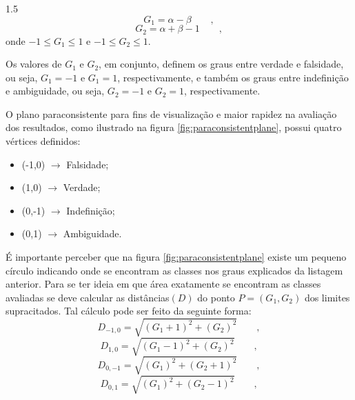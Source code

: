 \documentclass[a4paper,12pt,openright,oneside]{book}
\newenvironment{myenv}[1]
{\begin{spacing}{#1}}
	{\end{spacing}}
\begin{document}
\begin{myenv}{1.5}
\begin{equation}
G_1=\alpha-\beta\qquad,
\end{equation}
\begin{equation}
G_2=\alpha+\beta-1 \qquad,
\end{equation}
onde $-1 \leqslant G_1 \leqslant 1$ e  $-1 \leqslant G_2 \leqslant 1$.
\\
\par Os valores de $G_1$ e $G_2$, em conjunto, definem os graus entre verdade e falsidade, ou seja, $G_1=-1$ e $G_1=1$, respectivamente, e também os graus entre indefinição e ambiguidade, ou seja, $G_2=-1$ e $G_2=1$, respectivamente.
\\
\par O plano paraconsistente para fins de visualização e maior rapidez na avaliação dos resultados, como ilustrado na figura \ref{fig:paraconsistentplane}, possui quatro vértices definidos:
\begin{itemize}
\item (-1,0) $\rightarrow$ Falsidade;
\item (1,0) $\rightarrow$ Verdade;
\item (0,-1) $\rightarrow$ Indefinição;
\item (0,1) $\rightarrow$ Ambiguidade.
\end{itemize}
\par É importante perceber que na figura \ref{fig:paraconsistentplane} existe um pequeno círculo indicando onde se encontram as classes nos graus explicados da listagem anterior. Para se ter ideia em que área exatamente se encontram as classes avaliadas se deve calcular as distâncias$(D)$ do ponto $P=(G_1,G_2)$ dos limites supracitados. Tal cálculo pode ser feito da seguinte forma:
\begin{equation}
D_{-1,0}=\sqrt{(G_1+1)^2+(G_2)^2}\qquad,
\end{equation}
\begin{equation}
D_{1,0}=\sqrt{(G_1-1)^2+(G_2)^2}\qquad,
\end{equation}
\begin{equation}
D_{0,-1}=\sqrt{(G_1)^2+(G_2+1)^2}\qquad,		
\end{equation}
\begin{equation}
D_{0,1}=\sqrt{(G_1)^2+(G_2-1)^2}\qquad,
\end{equation}		
\begin{figure}[H]

\end{figure}
\end{myenv}
\end{document}
